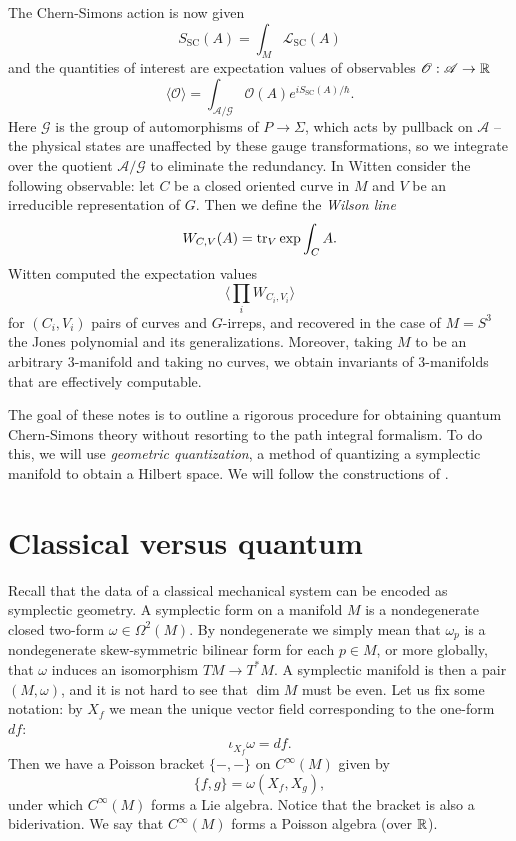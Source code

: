 \documentclass{amsart}
\begin{document}
The Chern-Simons action is now given
\begin{equation*}
    S_\text{SC}(A) = \int_M \mathscr{L}_\text{SC}(A)
\end{equation*}
and the quantities of interest are expectation values of observables $\mathscr{O}:\mathscr{A}\to\mathbb{R}$
\begin{equation*}
    \langle\mathscr{O}\rangle = \int_{\mathscr{A}/\mathscr{G}} \mathscr{O}(A) e^{iS_\text{SC}(A)/\hbar}.
\end{equation*}
Here $\mathscr{G}$ is the group of automorphisms of $P\to\Sigma$, which acts by pullback on
$\mathscr{A}$ -- the physical states are unaffected by these gauge transformations, so we integrate
over the quotient $\mathscr{A}/\mathscr{G}$ to eliminate the redundancy.
In \cite{witten} Witten consider the following observable: let $C$ be a closed oriented curve
in $M$ and $V$ be an irreducible representation of $G$. Then we define the \textit{Wilson line}
\begin{equation*}
    W_{C,V}(A) = \operatorname{tr}_V \exp\int_C A.
\end{equation*}
Witten computed the expectation values
\begin{equation*}
    \langle \prod_i W_{C_i,V_i}\rangle
\end{equation*}
for $(C_i,V_i)$ pairs of curves and $G$-irreps, and recovered in the case of $M=S^3$ the Jones
polynomial and its generalizations. Moreover, taking $M$ to be an arbitrary 3-manifold and taking
no curves, we obtain invariants of 3-manifolds that are effectively computable.

The goal of these notes is to outline a rigorous procedure for obtaining quantum Chern-Simons theory
without resorting to the path integral formalism. To do this, we will use \textit{geometric quantization},
a method of quantizing a symplectic manifold to obtain a Hilbert space. We will follow the constructions
of \cite{gq}.

\section{Classical versus quantum}
Recall that the data of a classical mechanical system can be encoded as symplectic geometry.
A symplectic form on a manifold $M$ is a nondegenerate closed two-form $\omega\in\Omega^2(M)$. 
By nondegenerate we simply mean that $\omega_p$ is a nondegenerate skew-symmetric bilinear form
for each $p\in M$, or more globally, that $\omega$ induces an isomorphism $TM\to T^*M$.
A symplectic manifold is then a pair $(M,\omega)$, and it is not hard to see that $\dim M$ must be even.
Let us fix some notation: by $X_f$ we mean the unique vector field corresponding to the one-form $df$:
\begin{equation*}
    \iota_{X_f}\omega = df.
\end{equation*}
Then we have a Poisson bracket $\{-,-\}$ on $C^\infty(M)$ given by
\begin{equation*}
    \{f, g\} = \omega(X_f, X_g),
\end{equation*}
under which $C^\infty(M)$ forms a Lie algebra. Notice that the bracket is also a biderivation. We say that
$C^\infty(M)$ forms a Poisson algebra (over $\mathbb{R}$).
\end{document}
